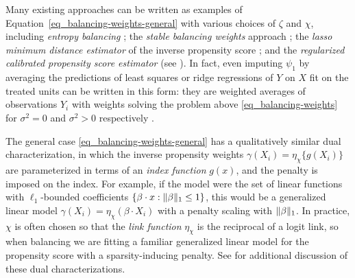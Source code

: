 \documentclass{article}
\DeclarePairedDelimiter\norm{\lVert}{\rVert}
\theoremstyle{definition}
\newcommand{\dispersion}{\chi}
\newcommand{\imbalancescale}{\zeta}
\newcommand{\<}{\langle}
\renewcommand{\>}{\rangle}
\begin{document}
Many existing approaches can be written as examples of Equation~\ref{eq_balancing-weights-general} with various
choices of $\imbalancescale$ and $\dispersion$, including
\emph{entropy balancing} \citep{hainmueller2012balancing}; the \emph{stable balancing weights} approach \citep{zubizarreta2015stable};
the \emph{lasso minimum distance estimator} of the inverse propensity score \citep{chernozhukov2018automatic};
and the \emph{regularized calibrated propensity score estimator} \citep{tan2020regularized} (see \cite{wang2020minimal}).
In fact, even imputing $\psi_1$ by averaging the predictions of least squares or ridge regressions  of $Y$ on $X$ fit on the treated units can be written in this form: they are weighted averages of observations $Y_i$ with
weights solving the problem above \eqref{eq_balancing-weights} for $\sigma^2=0$ and $\sigma^2 > 0$ respectively \citep{chattopadhyay2021implied, kallus2016generalized}.

The general case \eqref{eq_balancing-weights-general} has a qualitatively similar dual characterization, in which
the inverse propensity weights $\gamma(X_i) = \eta_{\dispersion}\{g(X_i)\}$
are parameterized in terms of an \emph{index function} $g(x)$, and the penalty is imposed on the index. For example, if the model were the set of linear functions with $\ell_1$-bounded coefficients $\{ \beta \cdot x : \norm{\beta}_1 \le 1\}$, this would be a generalized linear model $\gamma(X_i) = \eta_{\dispersion}(\beta \cdot X_i)$ with a penalty scaling with $\norm{\beta}_1$. In practice, $\dispersion$ is often chosen so that the \emph{link function} $\eta_{\dispersion}$ is the reciprocal of a logit link, so when balancing we are fitting a familiar generalized linear model for the propensity score with a sparsity-inducing penalty. See \citet{hirshberg2025bregman} for additional discussion of these dual characterizations.

\end{document}

